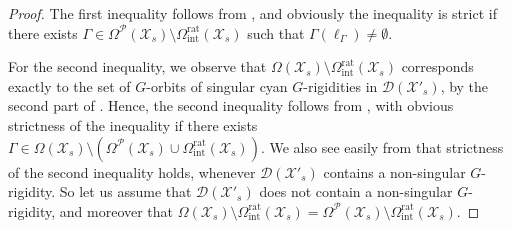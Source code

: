 \documentclass[a4paper,12pt,reqno]{amsart}
\newcommand\mc\mathcal
\theoremstyle{definition}
\numberwithin{equation}{thm}
\begin{document}
\begin{proof}
    The first inequality follows from , and obviously the inequality is strict if there exists $\Gamma \in \Omega^{ \mathcal{P}}(\mc{X}_s) \setminus \Omega^\mathrm{rat}_{\mathrm{int}}(\mc{X}_s)  $ such that $\Gamma(\ell_{\Gamma}) \neq \emptyset$. 

\smallskip

    For the second inequality, we observe that
    $\Omega(\mc{X}_s) \setminus \Omega^\mathrm{rat}_{\mathrm{int}}(\mc{X}_s)$ corresponds exactly to the set of $G$-orbits of singular cyan $G$-rigidities in $\mc{D}(\mc{X}'_s)$, by the second part of . 
    Hence, the second inequality follows from , with obvious strictness of the inequality if there exists $\Gamma \in  \Omega(\mc{X}_s)
    \setminus \left(\Omega^{\mathcal{P}}(\mc{X}_s) \cup \Omega^\mathrm{rat}_{\mathrm{int}}(\mc{X}_s)\right)$. 
     We also see easily from  
    that strictness of the second inequality holds, whenever $\mc{D}(\mc{X}'_s)$ contains a non-singular $G$-rigidity.
    So let us assume that $\mc{D}(\mc{X}'_s)$ does not contain a non-singular $G$-rigidity, and moreover that $ \Omega(\mc{X}_s) \setminus \Omega^\mathrm{rat}_{\mathrm{int}}(\mc{X}_s)  =  \Omega^{\mathcal{P}}(\mc{X}_s) \setminus \Omega^\mathrm{rat}_{\mathrm{int}}(\mc{X}_s)$.
    

\end{proof}
\end{document}
